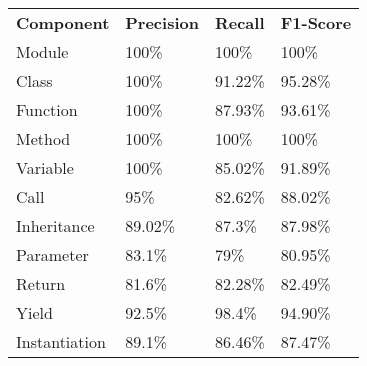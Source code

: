 \begin{tabularx}{\linewidth}{XXXX}
\toprule
\textbf{Component} & \textbf{Precision} & \textbf{Recall} & \textbf{F1-Score} \\
\cmidrule{1-1}\cmidrule{2-2}\cmidrule{3-3}\cmidrule{4-4}
Module & 100\% & 100\% & 100\% \\
\cmidrule{1-1}\cmidrule{2-2}\cmidrule{3-3}\cmidrule{4-4}
Class & 100\% & 91.22\% & 95.28\% \\
\cmidrule{1-1}\cmidrule{2-2}\cmidrule{3-3}\cmidrule{4-4}
Function & 100\% & 87.93\% & 93.61\% \\
\cmidrule{1-1}\cmidrule{2-2}\cmidrule{3-3}\cmidrule{4-4}
Method & 100\% & 100\% & 100\% \\
\cmidrule{1-1}\cmidrule{2-2}\cmidrule{3-3}\cmidrule{4-4}
Variable & 100\% & 85.02\% & 91.89\% \\
\cmidrule{1-1}\cmidrule{2-2}\cmidrule{3-3}\cmidrule{4-4}
Call & 95\% & 82.62\% & 88.02\% \\
\cmidrule{1-1}\cmidrule{2-2}\cmidrule{3-3}\cmidrule{4-4}
Inheritance & 89.02\% & 87.3\% & 87.98\% \\
\cmidrule{1-1}\cmidrule{2-2}\cmidrule{3-3}\cmidrule{4-4}
Parameter & 83.1\% & 79\% & 80.95\% \\
\cmidrule{1-1}\cmidrule{2-2}\cmidrule{3-3}\cmidrule{4-4}
Return & 81.6\% & 82.28\% & 82.49\% \\
\cmidrule{1-1}\cmidrule{2-2}\cmidrule{3-3}\cmidrule{4-4}
Yield & 92.5\% & 98.4\% & 94.90\% \\
\cmidrule{1-1}\cmidrule{2-2}\cmidrule{3-3}\cmidrule{4-4}
Instantiation & 89.1\% & 86.46\% & 87.47\% \\
\bottomrule
\end{tabularx}

